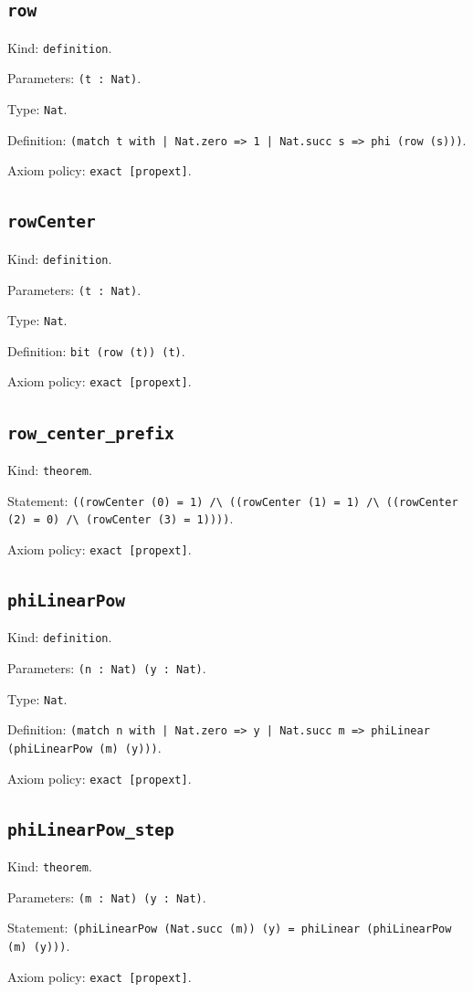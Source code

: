\documentclass[11pt]{article}
\begin{document}
\subsection*{\texttt{row}}
\noindent Kind: \texttt{definition}.\par
\noindent Parameters: \texttt{(t : Nat)}.\par
\noindent Type: \texttt{Nat}.\par
\noindent Definition: \texttt{(match t with | Nat.zero => 1 | Nat.succ s => phi (row (s)))}.\par
\noindent Axiom policy: \texttt{exact [propext]}.\par
\subsection*{\texttt{rowCenter}}
\noindent Kind: \texttt{definition}.\par
\noindent Parameters: \texttt{(t : Nat)}.\par
\noindent Type: \texttt{Nat}.\par
\noindent Definition: \texttt{bit (row (t)) (t)}.\par
\noindent Axiom policy: \texttt{exact [propext]}.\par
\subsection*{\texttt{row\_center\_prefix}}
\noindent Kind: \texttt{theorem}.\par
\noindent Statement: \texttt{((rowCenter (0) = 1) /\textbackslash{} ((rowCenter (1) = 1) /\textbackslash{} ((rowCenter (2) = 0) /\textbackslash{} (rowCenter (3) = 1))))}.\par
\noindent Axiom policy: \texttt{exact [propext]}.\par
\subsection*{\texttt{phiLinearPow}}
\noindent Kind: \texttt{definition}.\par
\noindent Parameters: \texttt{(n : Nat) (y : Nat)}.\par
\noindent Type: \texttt{Nat}.\par
\noindent Definition: \texttt{(match n with | Nat.zero => y | Nat.succ m => phiLinear (phiLinearPow (m) (y)))}.\par
\noindent Axiom policy: \texttt{exact [propext]}.\par
\subsection*{\texttt{phiLinearPow\_step}}
\noindent Kind: \texttt{theorem}.\par
\noindent Parameters: \texttt{(m : Nat) (y : Nat)}.\par
\noindent Statement: \texttt{(phiLinearPow (Nat.succ (m)) (y) = phiLinear (phiLinearPow (m) (y)))}.\par
\noindent Axiom policy: \texttt{exact [propext]}.\par
\end{document}

